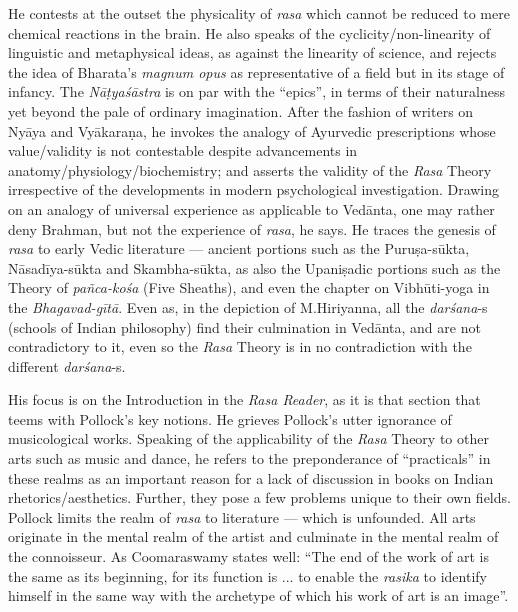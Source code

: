 He contests at the outset the physicality of \textsl{rasa} which cannot be reduced to mere chemical reactions in the brain. He also speaks of the cyclicity/non-linearity of linguistic and metaphysical ideas, as against the linearity of science, and rejects the idea of Bharata’s \textsl{magnum opus} as representative of a field but in its stage of infancy. The \textsl{Nāṭyaśāstra} is on par with the “epics”, in terms of their naturalness yet beyond the pale of ordinary imagination. After the fashion of writers on Nyāya and Vyākaraṇa, he invokes the analogy of Ayurvedic prescriptions whose value/validity is not contestable despite advancements in anatomy/physiology/biochemistry; and asserts the validity of the \textsl{Rasa} Theory irrespective of the developments in modern psychological investigation. Drawing on an analogy of universal experience as applicable to Vedānta, one may rather deny Brahman, but not the experience of \textsl{rasa}, he says. He traces the genesis of \textsl{rasa} to early Vedic literature --- ancient portions such as the Puruṣa-sūkta, Nāsadīya-sūkta and Skambha-sūkta, as also the Upaniṣadic portions such as the Theory of \textsl{pañca-kośa} (Five Sheaths), and even the chapter on Vibhūti-yoga in the \textsl{Bhagavad-gītā}. Even as, in the depiction of M.\@ Hiriyanna, all the \textsl{darśana}-s (schools of Indian philosophy) find their culmination in Vedānta, and are not contradictory to it, even so the \textsl{Rasa} Theory is in no contradiction with the different \textsl{darśana}-s.

His focus is on the Introduction in the \textsl{Rasa Reader}, as it is that section that teems with Pollock’s key notions. He grieves Pollock’s utter ignorance of musicological works. Speaking of the applicability of the \textsl{Rasa} Theory to other arts such as music and dance, he refers to the preponderance of “practicals” in these realms as an important reason for a lack of discussion in books on Indian rhetorics/aesthetics. Further, they pose a few problems unique to their own fields. Pollock limits the realm of \textsl{rasa} to literature --- which is unfounded. All arts originate in the mental realm of the artist and culminate in the mental realm of the connoisseur. As Coomaraswamy states well: “The end of the work of art is the same as its beginning, for its function is ... to enable the \textsl{rasika} to identify himself in the same way with the archetype of which his work of art is an image”.

